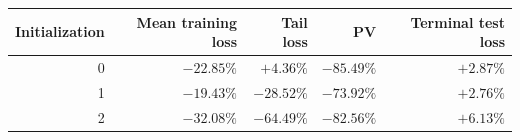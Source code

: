 \begin{tabular}{@{}rrrrr@{}}
\toprule
Initialization & Mean training loss & Tail loss & PV & Terminal test loss \\
\midrule
0 & $-22.85\%$ & $+4.36\%$ & $-85.49\%$ & $+2.87\%$ \\
1 & $-19.43\%$ & $-28.52\%$ & $-73.92\%$ & $+2.76\%$ \\
2 & $-32.08\%$ & $-64.49\%$ & $-82.56\%$ & $+6.13\%$ \\
\bottomrule
\end{tabular}
